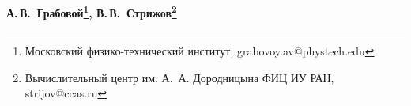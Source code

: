 \documentclass[12pt, twoside]{article}
\begin{document}

\begin{center}
\bf
А.\,В.~Грабовой\footnote{Московский физико-технический институт, grabovoy.av@phystech.edu}, В.\,В.~Стрижов\footnote{Вычислительный центр им. А.~А. Дородницына	ФИЦ ИУ РАН, strijov@ccas.ru}

\end{center}
\end{document}
